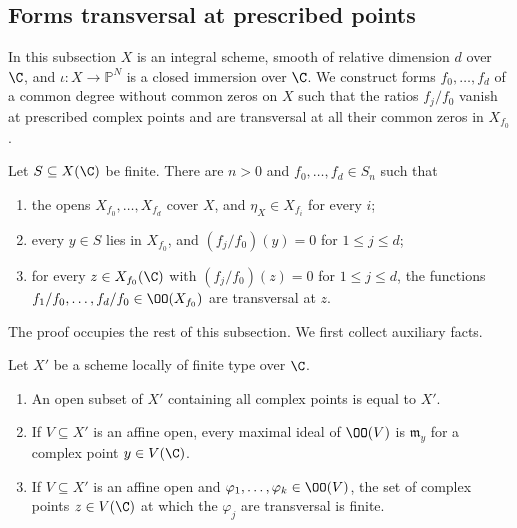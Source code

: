 \subsection{Forms transversal at prescribed points}\label{sec:pf:hlf-cech:forms}

In this subsection $X$ is an integral scheme, smooth of relative dimension $d$ over $\C$, and $\iota\colon X\to\mathbb P^N$ is a closed
immersion over $\C$. We construct forms $f_0,\dots,f_d$ of a common degree without common zeros on $X$ such that the ratios $f_j/f_0$ vanish
at prescribed complex points and are transversal at all their common zeros in $X_{f_0}$.

\begin{theorem}\label{pf:hlf-cech:forms}
Let $S\subseteq X(\C)$ be finite. There are $n>0$ and $f_0,\dots,f_d\in S_n$ such that
\begin{enumerate}[label=(\arabic*),nosep]
\item the opens $X_{f_0},\dots,X_{f_d}$ cover $X$, and $\eta_X\in X_{f_i}$ for every $i$;
\item every $y\in S$ lies in $X_{f_0}$, and $(f_j/f_0)(y)=0$ for $1\le j\le d$;
\item for every $z\in X_{f_0}(\C)$ with $(f_j/f_0)(z)=0$ for $1\le j\le d$, the functions $f_1/f_0,\dots,f_d/f_0\in\OO(X_{f_0})$ are
  transversal at $z$.
\end{enumerate}
\end{theorem}

The proof occupies the rest of this subsection. We first collect auxiliary facts.

\begin{lemma}\label{pf:hlf-cech:closedpts}
Let $X'$ be a scheme locally of finite type over $\C$.
\begin{enumerate}[label=(\alph*),nosep]
\item An open subset of $X'$ containing all complex points is equal to $X'$.
\item If $V\subseteq X'$ is an affine open, every maximal ideal of $\OO(V)$ is $\mathfrak m_y$ for a complex point $y\in V(\C)$.
\item If $V\subseteq X'$ is an affine open and $\varphi_1,\dots,\varphi_k\in\OO(V)$, the set of complex points $z\in V(\C)$ at which the
  $\varphi_j$ are transversal is finite.
\end{enumerate}
\end{lemma}

